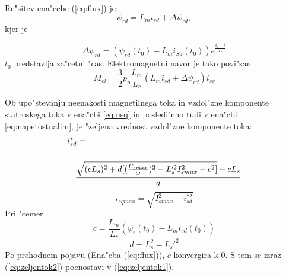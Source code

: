 \documentclass[journal,a4paper,twoside]{sty/IEEEtran}
\begin{document}
Re"sitev ena"cebe (\ref{eq:flux}) je:
\begin{equation}
\label{eq:Lm+delta}
\psi_{rd}=L_m i_{sd}+\Delta \psi_{rd}\mathrm{,}
\end{equation}
 kjer je
 
 \begin{equation}
\label{eq:delta}
\Delta \psi_{rd}=(\psi_{rd}(t_0)-L_m i_{Sd}(t_0))e^{\frac{t_0-t}{T_r}}
\end{equation}
$t_0$ predstavlja za"cetni "cas. Elektromagnetni navor je tako povi"san
\begin{equation}
\label{navor3}
M_{el}=\frac{3}{2}p_p \frac{L_m}{L_r}(L_m i_{sd}+\Delta \psi_{rd})i_{sq}
\end{equation}

Ob upo"stevanju neenakosti magnetilnega toka in vzdol"zne komponente statroskega toka v ena"cbi \ref{eq:usq} in posledi"cno tudi v ena"cbi \ref{eq:napetostnalim}, je "zeljena vrednost vzdol"zne komponente toka:
\begin{equation}
\label{eq:zeljentok2}
\centering
\begin{multlined}
i_{sd}^*= \\ \\
\frac{\sqrt{(c L_s)^2+d[(\frac{U_{smax}}{\omega})^2-L_s'^2I_{smax}^2-c^2]}-cL_s}{d}                 
\end{multlined}
\end{equation}
\begin{equation}
i_{sqmax}=\sqrt{I_{smax}^2-i_{sd}^{*2}}
\end{equation}
Pri "cemer
$$c=\frac{L_m}{L_r}(\psi_{r}(t_0)-L_m i_{sd}(t_0))$$
$$d=L_s^2-L_s'^2$$
Po prehodnem pojavu (Ena"cba (\ref{eq:flux})), $c$ konvergira k 0. S tem se izraz (\ref{eq:zeljentok2}) poenostavi v (\ref{eq:zeljentok1}).\cite{vas}
\end{document}
